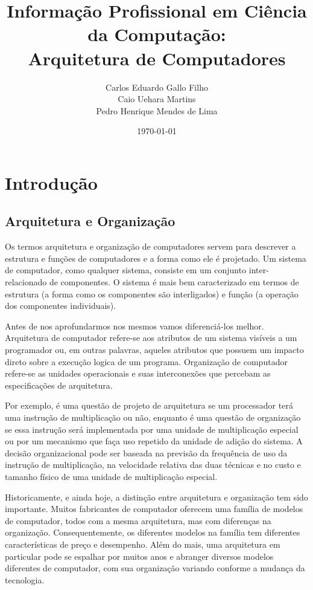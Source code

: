 \documentclass{article}
\title{Informação Profissional em Ciência da Computação:\\
       Arquitetura de Computadores}
\author{Carlos Eduardo Gallo Filho \\
        Caio Uehara Martins\\
        Pedro Henrique Mendes de Lima}
\date{\today}
\begin{document}
\maketitle

\section{Introdução}
\subsection{Arquitetura e Organização}
Os termos arquitetura e organização de computadores servem para descrever a
estrutura e funções de computadores e a forma como ele é projetado. Um sistema
de computador, como qualquer sistema, consiste em um conjunto inter-relacionado
de componentes. O sistema é mais bem caracterizado em termos de estrutura (a
forma como os componentes são interligados) e função (a operação dos
componentes individuais).

Antes de nos aprofundarmos nos mesmos vamos diferenciá-los melhor. Arquitetura
de computador refere-se aos atributos de um sistema visíveis a um programador
ou, em outras palavras, aqueles atributos que possuem um impacto direto sobre a
execução logica de um programa. Organização de computador refere-se as unidades
operacionais e suas interconexões que percebam as especificações de
arquitetura. 

Por exemplo, é uma questão de projeto de arquitetura se um processador terá uma
instrução de multiplicação ou não, enquanto é uma questão de organização se essa
instrução será implementada por uma unidade de multiplicação especial ou por um
mecanismo que faça uso repetido da unidade de adição do sistema. A decisão
organizacional pode ser baseada na previsão da frequência de uso da instrução
de multiplicação, na velocidade relativa das duas técnicas e no custo e tamanho
físico de uma unidade de multiplicação especial.

Historicamente, e ainda hoje, a distinção entre arquitetura e organização tem
sido importante. Muitos fabricantes de computador oferecem uma família de
modelos de computador, todos com a mesma arquitetura, mas com diferenças na
organização. Consequentemente, os diferentes modelos na família tem diferentes
características de preço e desempenho. Além do mais, uma arquitetura em
particular pode se espalhar por muitos anos e abranger diversos modelos
diferentes de computador, com sua organização variando conforme a mudança da
tecnologia.
\end{document}
